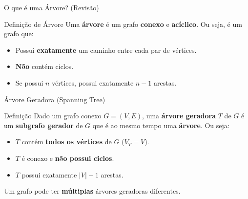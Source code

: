\documentclass[9pt]{beamer}
\begin{document}
\begin{frame}{O que é uma Árvore? (Revisão)}
    \begin{block}{Definição de Árvore}
        Uma \textbf{árvore} é um grafo \textbf{conexo} e \textbf{acíclico}. Ou seja, é um grafo que:
        \begin{itemize}
            \item Possui \textbf{exatamente} um caminho entre cada par de vértices.
            \item \textbf{Não} contém ciclos.
            \item Se possui $n$ vértices, possui exatamente $n - 1$ arestas.
        \end{itemize}
    \end{block}
    \vspace{0.4cm}
    \begin{center}
    \end{center}
\end{frame}

\begin{frame}{Árvore Geradora (Spanning Tree)}
    \begin{block}{Definição}
        Dado um grafo conexo $G = (V, E)$, uma \textbf{árvore geradora} $T$ de $G$ é um \textbf{subgrafo gerador} de $G$ que é ao mesmo tempo uma \textbf{árvore}. Ou seja:
        \begin{itemize}
            \item $T$ contém \textbf{todos os vértices} de $G$ ($V_T = V$).
            \item $T$ é conexo e \textbf{não possui ciclos}.
            \item $T$ possui exatamente $|V| - 1$ arestas.
        \end{itemize}
    \end{block}
    \vspace{0.3cm}
    Um grafo pode ter \textbf{múltiplas} árvores geradoras diferentes.
\end{frame}
\end{document}
